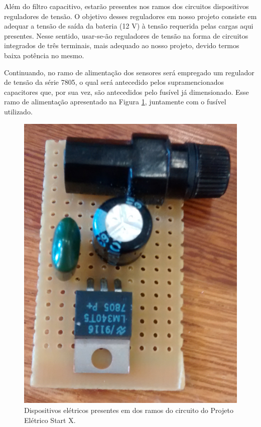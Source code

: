 Além do filtro capacitivo, estarão presentes nos ramos dos circuitos dispositivos reguladores de tensão. O objetivo desses reguladores em nosso projeto consiste em adequar a tensão de saída da bateria (12 V) à tensão requerida pelas cargas aqui presentes. Nesse sentido, usar-se-ão reguladores de tensão na forma de circuitos integrados de três terminais, mais adequado ao nosso projeto, devido termos baixa potência no mesmo.

Continuando, no ramo de alimentação dos sensores será empregado um regulador de tensão da série 7805, o qual será antecedido pelos supramencionados capacitores que, por sua vez, são antecedidos pelo fusível já dimensionado. Esse ramo de alimentação apresentado na Figura \ref{fonte-reguladora}, juntamente com o fusível utilizado. 

\begin{figure}[h]
	\centering
	\includegraphics[scale=0.7]		{figuras/regulador7805.png}
	\caption{Dispositivos elétricos presentes em dos ramos do circuito do Projeto Elétrico Start X. }
	\label{fonte-reguladora}
\end{figure}


